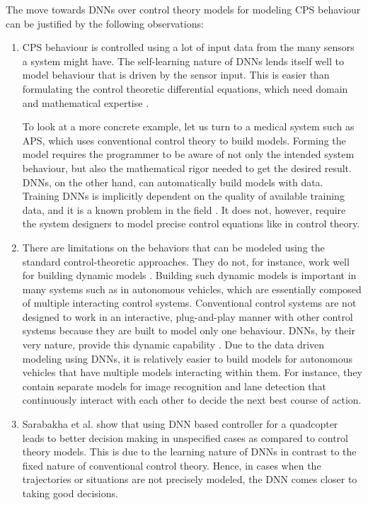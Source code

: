 The move towards DNNs over control theory models for modeling \ac{CPS} behaviour can be justified by the following observations:
\begin{enumerate}
	\item CPS behaviour is controlled using a lot of input data from the many sensors a system might have. The self-learning nature of DNNs lends itself well to model behaviour that is driven by the sensor input. This is easier than formulating the control theoretic differential equations, which need domain and mathematical expertise \cite{Aamir_2013}.
	
	
	To look at a more concrete example, let us turn to a medical system such as \ac{APS}, which uses conventional control theory to build models. 
	Forming the model requires the programmer to be aware of not only the intended system behaviour, but also the mathematical rigor needed to get the desired result. 
	DNNs, on the other hand, can automatically build models with data.
	Training DNNs is implicitly dependent on the quality of available training data, and it is a known problem in the field \cite{jabbar2015methods}. It does not, however, require the system designers to model precise control equations like in control theory.
	\item  There are limitations on the behaviors that can be modeled using the standard control-theoretic approaches. They do not, for instance, work well for building dynamic models \cite{article23}. Building such dynamic models is important in many systems such as in autonomous vehicles, which are essentially composed of multiple interacting control systems. Conventional control systems are not designed to work in an interactive, plug-and-play manner with other control systems because they are built to model only one behaviour. DNNs, by their very nature,  provide this dynamic capability \cite{article23}. 
	Due to the data driven modeling using DNNs, it is relatively easier to build models for autonomous vehicles that have multiple models interacting within them.
	For instance, they contain separate models for image recognition and lane detection that continuously interact with each other to decide the next best course of action.
	
	\item Sarabakha et al. \cite{sarabakha2019online} show that using \ac{DNN} based controller for a quadcopter leads to better decision making in unspecified cases as compared to control theory models.
	This is due to the learning nature of \ac{DNN}s in contrast to the fixed nature of conventional control theory. 
	Hence, in cases when the trajectories or situations are not precisely modeled, the \ac{DNN} comes closer to taking good decisions.
\end{enumerate}




